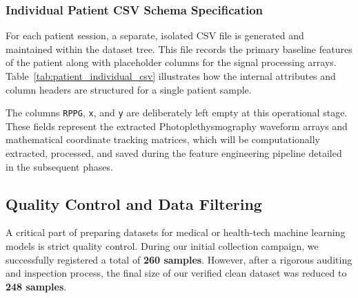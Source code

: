 \subsubsection{Individual Patient CSV Schema Specification}
For each patient session, a separate, isolated CSV file is generated and maintained within the dataset tree. This file records the primary baseline features of the patient along with placeholder columns for the signal processing arrays. Table~\ref{tab:patient_individual_csv} illustrates how the internal attributes and column headers are structured for a single patient sample.

\begin{table}[H]
\centering
\caption{Structural Layout and Attributes of an Individual Patient CSV File}
\label{tab:patient_individual_csv}
\vspace{0.5em}
\end{table}

The columns \texttt{RPPG}, \texttt{x}, and \texttt{y} are deliberately left empty at this operational stage. These fields represent the extracted Photoplethysmography waveform arrays and mathematical coordinate tracking matrices, which will be computationally extracted, processed, and saved during the feature engineering pipeline detailed in the subsequent phases.

\subsection{Quality Control and Data Filtering}
A critical part of preparing datasets for medical or health-tech machine learning models is strict quality control. During our initial collection campaign, we successfully registered a total of \textbf{260 samples}. However, after a rigorous auditing and inspection process, the final size of our verified clean dataset was reduced to \textbf{248 samples}.

